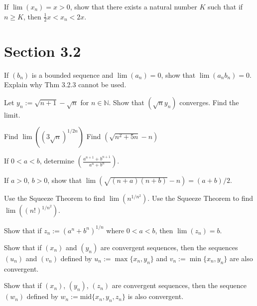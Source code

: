 \documentclass[paper=a4, fontsize=11pt]{scrartcl} %
\numberwithin{equation}{section} %
\numberwithin{figure}{section} %
\numberwithin{table}{section} %
\begin{document}
\pf

 If $\lim(x_n) = x > 0$, show that there exists a natural number $K$ such that if $n \geq K$, then $\frac{1}{2}x < x_n < 2x$.
\pf

\section*{Section 3.2}
 If $(b_n)$ is a bounded sequence and $\lim(a_n) = 0$, show that $\lim(a_n b_n) = 0$. Explain why Thm 3.2.3 cannot be used.
\pf

 Let $y_n := \sqrt{n+1} - \sqrt{n}$ for $n \in \mathbb{N}$. Show that $(\sqrt{n} y_n)$ converges. Find the limit.
\pf

 Find $\lim\left((3\sqrt{n})^{1/2n}\right)$
\pf
{} Find $(\sqrt{n^2 + 5n} - n)$
\pf

\newcommand{\anp}{a^{n+1}}
\newcommand{\bnp}{b^{n+1}}
 If $0 < a < b$, determine $\left(\frac{\anp + \bnp}{a^n + b^n}\right)$.
\pf

 If $a > 0$, $b > 0$, show that $\lim\left(\sqrt{(n+a)(n+b)} - n\right) = (a + b)/2$.
\pf

 Use the Squeeze Theorem to find $\lim(n^{1/n^2})$.
\pf
{} Use the Squeeze Theorem to find $\lim((n!)^{1/n^2})$.
\pf

 Show that if $z_n := (a^n + b^n)^{1/n}$ where $0 < a < b$, then $\lim(z_n) = b$.
\pf

 Show that if $(x_n)$ and $(y_n)$ are convergent sequences, then the sequences $(u_n)$ and $(v_n)$ defined by $u_n := \max\{x_n, y_n\}$ and $v_n := \min\{x_n, y_n\}$ are also convergent.
\pf

 Show that if $(x_n)$, $(y_n)$, $(z_n)$ are convergent sequences, then the sequence $(w_n)$ defined by $w_n := \text{mid}\{x_n, y_n, z_n\}$ is also convergent.
\pf
\end{document}
